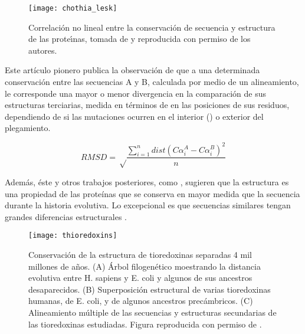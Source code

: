 \begin{figure}
\begin{center} 
\texttt{[image: chothia\_lesk]}
\caption%
{
Correlaci\'{o}n no lineal entre la conservaci\'{o}n de secuencia y estructura de las prote\'\i{}nas,
tomada de \cite{Chothia1986} y reproducida con permiso de los autores.
}
\label{fig:chothia_lesk}
\end{center}
\end{figure}

Este art\'{i}culo pionero publica la observaci\'{o}n de que a una determinada conservaci\'{o}n entre las secuencias A y B,
calculada por medio de un alineamiento, le corresponde una mayor o menor divergencia en la comparaci\'{o}n de sus estructuras
terciarias, medida en t\'{e}rminos de  
en las posiciones de sus residuos, dependiendo de si las mutaciones ocurren en el interior () o exterior del plegamiento. 

\begin{equation}
RMSD = \sqrt \frac{\sum_{i=1}^n dist(C\alpha_{i}^A - C\alpha_{i}^B)^2}{n}
\end{equation} 

Adem\'{a}s, \'{e}ste y otros trabajos posteriores, como \citet{Illergard2009, PascualGarcia2010},
sugieren que la estructura es una propiedad de las prote\'{i}nas que se conserva en mayor medida que la secuencia
durante la historia evolutiva. Lo excepcional es que secuencias similares tengan grandes diferencias estructurales \citep{Kosloff2008}.

\begin{figure}
\begin{center} 
\texttt{[image: thioredoxins]}
\caption%
{
Conservaci\'{o}n de la estructura de tioredoxinas separadas 4 mil millones de a\~{n}os.
(A) \'{A}rbol filogen\'{e}tico moestrando la distancia evolutiva entre H. sapiens y E. coli y algunos de sus ancestros desaparecidos.
(B) Superposici\'{o}n estructural de varias tioredoxinas humanas, de E. coli, y de algunos ancestros prec\'{a}mbricos.
(C) Alineamiento m\'{u}ltiple de las secuencias y estructuras secundarias de las tioredoxinas estudiadas.
Figura reproducida con permiso de \cite{InglesPrieto2013}.
}
\label{fig:thioredoxins}
\end{center}
\end{figure}

